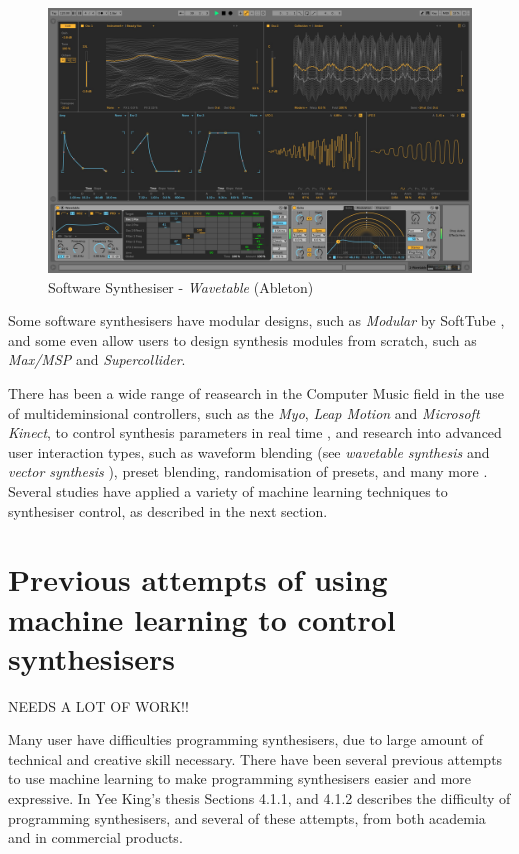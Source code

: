 \documentclass[11pt, oneside]{report}   	%
\begin{document}
\begin{figure}[h] 
	\centering
	\includegraphics[width = 6in]{AbletonWavetable.jpg}
	\caption{Software Synthesiser - \emph{Wavetable} (Ableton)\cite{Wavetable} }
	\label{fig:AbletonWavetable}
\end{figure}

Some software synthesisers have modular designs, such as \emph{Modular} by SoftTube \cite{SoftTube}, and some even allow users to design synthesis modules from scratch, such as \emph{Max/MSP} and \emph{Supercollider}.

There has been a wide range of reasearch in the Computer Music field in the use of multideminsional controllers, such as the  \emph{Myo}, \emph{Leap Motion} and \emph{Microsoft Kinect}, to control synthesis parameters in real time \cite{ICMC, TubbThesis}, and research into advanced user interaction types, such as waveform blending (see \emph{wavetable synthesis}\cite{Wavetable} and \emph{vector synthesis} \cite{SY22}), preset blending, randomisation of presets, and many more \cite{YeeKing, EvolvedAudioEffects}.  Several studies have applied a variety of machine learning techniques to synthesiser control, as described in the next section.

\section{Previous attempts of using machine learning to control synthesisers}
NEEDS A LOT OF WORK!!

Many user have difficulties programming synthesisers, due to large amount of technical and creative skill necessary. There have been several previous attempts to use machine learning to make programming synthesisers easier and more expressive. In Yee King's thesis \cite{YeeKing} Sections 4.1.1, and 4.1.2 describes the difficulty of programming synthesisers, and several of these attempts, from both academia and in commercial products.
\end{document}
